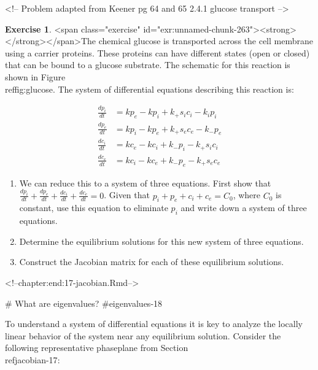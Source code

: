 \documentclass[
]{book}
\theoremstyle{definition}
\theoremstyle{definition}
\theoremstyle{definition}
\newtheorem{exercise}{Exercise}[chapter]
\theoremstyle{remark}
\begin{document}
<!-- Problem adapted from Keener pg 64 and 65 2.4.1 glucose transport -->
\begin{exercise}
<span class="exercise" id="exr:unnamed-chunk-263"><strong>\label{exr:unnamed-chunk-263} </strong></span>The chemical glucose is transported across the cell membrane using a carrier proteins.  These proteins can have different states (open or closed) that can be bound to a glucose substrate.  The schematic for this reaction is shown in Figure \\ref{fig:glucose}.  The system of differential equations describing this reaction is:
  
\begin{equation}
\begin{split}
\frac{dp_{i}}{dt} &= k p_{e} - k p_{i} + k_{+} s_{i}c_{i}-k_{i}p_{i} \\
\frac{dp_{e}}{dt} &= k p_{i} - k p_{e} + k_{+} s_{e}c_{e}-k_{-}p_{e} \\
\frac{dc_{i}}{dt} &= k c_{e} - k c_{i} + k_{-} p_{i}-k_{+}s_{i}c_{i} \\
\frac{dc_{e}}{dt} &= k c_{i} - k c_{e} + k_{-} p_{e}-k_{+}s_{e}c_{e}
\end{split}
\end{equation}

\begin{enumerate}[label=\alph*.]
\item We can reduce this to a system of three equations.  First show that $\displaystyle \frac{dp_{i}}{dt} + \frac{dp_{e}}{dt}+ \frac{dc_{i}}{dt} + \frac{dc_{e}}{dt} = 0$.  Given that $p_{i}+p_{e}+c_{i}+c_{e}=C_{0}$, where $C_{0}$ is constant, use this equation to eliminate $p_{i}$ and write down a system of three equations.
\item Determine the equilibrium solutions for this new system of three equations.
\item Construct the Jacobian matrix for each of these equilibrium solutions.
\end{enumerate}
\end{exercise}

<!--chapter:end:17-jacobian.Rmd-->

# What are eigenvalues? {#eigenvalues-18}

To understand a system of differential equations it is key to analyze the locally linear behavior of the system near any equilibrium solution. Consider the following representative phaseplane from Section \\ref{jacobian-17}:
\end{document}
